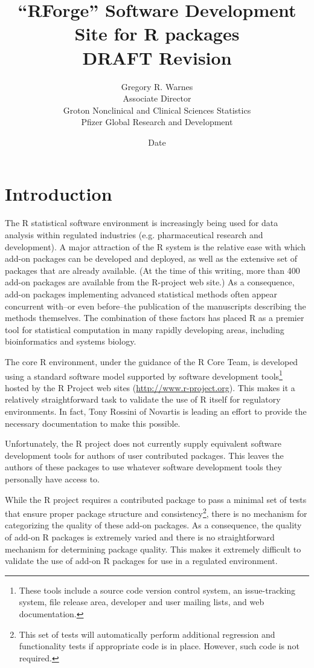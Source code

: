\documentclass[12pt]{article}
\title{``RForge'' Software Development Site for R packages\\
       \textbf{DRAFT} $ $Revision$ $ }
\date{ $ $Date$ $ }
\author{Gregory R. Warnes\\
  Associate Director\\
  Groton Nonclinical and Clinical Sciences Statistics\\
  Pfizer Global Research and Development}
\begin{document}
\maketitle

\section{Introduction}

The R statistical software environment is increasingly being used
for data analysis within regulated industries (e.g. pharmaceutical
research and development).  A major attraction of the R system is
the relative ease with which add-on packages can be developed and
deployed, as well as the extensive set of packages that are
already available.  (At the time of this writing, more than 400
add-on packages are available from the R-project web site.)  As a
consequence, add-on packages implementing advanced statistical
methods often appear concurrent with--or even before--the
publication of the manuscripts describing the methods themselves.
The combination of these factors has placed R as a premier tool
for statistical computation in many rapidly developing areas,
including bioinformatics and systems biology.

The core R environment, under the guidance of the R Core Team, is
developed using a standard software model supported by software
development tools\footnote{These tools include a source code version
  control system, an issue-tracking system, file release area,
  developer and user mailing lists, and web documentation.}  hosted by
the R Project web sites (\url{http://www.r-project.org}).  This makes it a
relatively straightforward task to validate the use of R itself
for regulatory environments.  In fact, Tony Rossini of Novartis is
leading an effort to provide the necessary documentation to make this
possible.

Unfortunately, the R project does not currently supply equivalent
software development tools for authors of user contributed packages.
This leaves the authors of these packages to use whatever software
development tools they personally have access to.

While the R project requires a contributed package to pass a minimal
set of tests that ensure proper package structure and
consistency\footnote{This set of tests will automatically perform
  additional regression and functionality tests if appropriate code is
  in place.  However, such code is not required.}, there is no
mechanism for categorizing the quality of these add-on packages.  As a
consequence, the quality of add-on R packages is extremely varied and
there is no straightforward mechanism for determining package quality.
This makes it extremely difficult to validate the use of add-on R
packages for use in a regulated environment.
\end{document}
